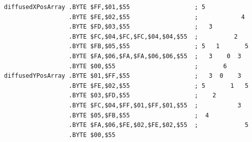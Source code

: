 \begin{lstlisting}
diffusedXPosArray .BYTE $FF,$01,$55                  ; 5            
                  .BYTE $FE,$02,$55                  ;            4 
                  .BYTE $FD,$03,$55                  ;   3          
                  .BYTE $FC,$04,$FC,$FC,$04,$04,$55  ;          2   
                  .BYTE $FB,$05,$55                  ; 5   1       5
                  .BYTE $FA,$06,$FA,$FA,$06,$06,$55  ;   3    0  3  
                  .BYTE $00,$55                      ;       6      
diffusedYPosArray .BYTE $01,$FF,$55                  ;   3  0    3  
                  .BYTE $FE,$02,$55                  ; 5       1   5
                  .BYTE $03,$FD,$55                  ;    2         
                  .BYTE $FC,$04,$FF,$01,$FF,$01,$55  ;           3  
                  .BYTE $05,$FB,$55                  ;  4           
                  .BYTE $FA,$06,$FE,$02,$FE,$02,$55  ;             5
                  .BYTE $00,$55
\end{lstlisting}


